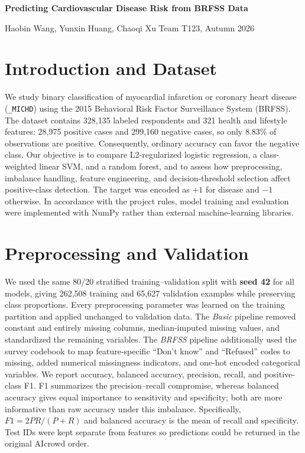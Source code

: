 \documentclass[10pt,a4paper]{article}
\begin{document}
{\centering
{\fontsize{15}{17}\selectfont\bfseries Predicting Cardiovascular Disease Risk from BRFSS Data\par}
\vspace{3pt}
{\small Haobin Wang, Yunxin Huang, Chaoqi Xu \hfill Team T123, Autumn 2026\par}
}

\section{Introduction and Dataset}

We study binary classification of myocardial infarction or coronary heart
disease (\texttt{\_MICHD}) using the 2015 Behavioral Risk Factor Surveillance
System (BRFSS). The dataset contains 328,135 labeled respondents and 321 health
and lifestyle features: 28,975 positive cases and 299,160 negative cases, so
only 8.83\% of observations are positive. Consequently, ordinary accuracy can
favor the negative class. Our objective is to compare
L2-regularized logistic regression, a class-weighted linear SVM, and a random
forest, and to assess how preprocessing, imbalance handling, feature
engineering, and decision-threshold selection affect positive-class detection.
The target was encoded as $+1$ for disease and $-1$ otherwise. In accordance
with the project rules, model training and evaluation were implemented with
NumPy rather than external machine-learning libraries.

\section{Preprocessing and Validation}

We used the same 80/20 stratified training--validation split with
\textbf{seed 42} for all models, giving 262,508 training and 65,627 validation
examples while preserving class proportions. Every
preprocessing parameter was learned on the training partition and applied
unchanged to validation data. The \emph{Basic} pipeline removed constant and
entirely missing columns, median-imputed missing values, and standardized the
remaining variables. The \emph{BRFSS} pipeline additionally used the survey
codebook to map feature-specific ``Don't know'' and ``Refused'' codes to
missing, added numerical missingness indicators, and one-hot encoded
categorical variables. We report accuracy, balanced accuracy, precision,
recall, and positive-class F1. F1 summarizes the precision--recall compromise,
whereas balanced accuracy gives equal importance to sensitivity and
specificity; both are more informative than raw accuracy under this imbalance.
Specifically, $F1=2PR/(P+R)$ and balanced accuracy is the mean of recall and
specificity. Test IDs were kept separate from features so predictions could be
returned in the original AIcrowd order.
\end{document}
